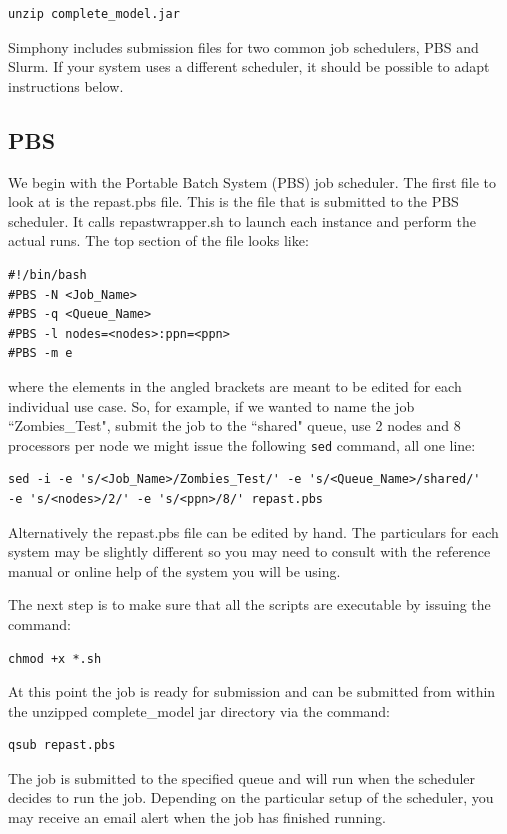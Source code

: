 \documentclass[11pt]{amsart}
\begin{document}
\begin{verbatim}
unzip complete_model.jar
\end{verbatim}

Simphony includes submission files for two common job schedulers, PBS and Slurm. If your system uses a different scheduler, it should be possible to adapt instructions below. 

\subsection{PBS}
We begin with the Portable Batch System (PBS) job scheduler. The first file to look at is the repast.pbs file. This is the file that is submitted to the PBS scheduler. It calls repastwrapper.sh to launch each instance and perform the actual runs. The top section of the file looks like:
\begin{verbatim}
#!/bin/bash
#PBS -N <Job_Name>
#PBS -q <Queue_Name>
#PBS -l nodes=<nodes>:ppn=<ppn>
#PBS -m e
\end{verbatim}

\noindent where the elements in the angled brackets are meant to be edited for each individual use case. So, for example, if we wanted to name the job ``Zombies\_Test", submit the job to the ``shared" queue,  use 2 nodes and 8 processors per node we might issue the following \texttt{sed} command, all one line:
\begin{verbatim}
sed -i -e 's/<Job_Name>/Zombies_Test/' -e 's/<Queue_Name>/shared/'
-e 's/<nodes>/2/' -e 's/<ppn>/8/' repast.pbs
\end{verbatim}
Alternatively the repast.pbs file can be edited by hand. The particulars for each system may be slightly different so you may need to consult with the reference manual or online help of the system you will be using.

The next step is to make sure that all the scripts are executable by issuing the command:
\begin{verbatim}
chmod +x *.sh
\end{verbatim}
At this point the job is ready for submission and can be submitted from within the unzipped complete\_model jar directory via the command:
\begin{verbatim}
qsub repast.pbs
\end{verbatim}

The job is submitted to the specified queue and will run when the scheduler decides to run the job. Depending on the particular setup of the scheduler, you may receive an email alert when the job has finished running. 
\end{document}
